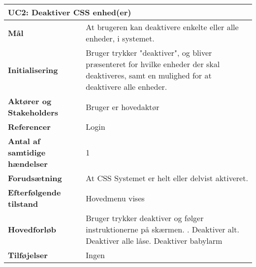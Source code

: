 \begin{table}[H] \centering
\begin{tabular}{|p{6cm}|p{8cm}|}
	\hline
\multicolumn{2}{|l|}{\textbf{UC2: Deaktiver CSS enhed(er)}} \\\hline
\textbf{Mål}	&
At brugeren kan deaktivere enkelte eller alle enheder, i systemet.
\\\hline
\textbf{Initialisering} &
Bruger trykker "deaktiver", og bliver
præsenteret for hvilke enheder der skal deaktiveres, samt en mulighed for at deaktivere alle
enheder. 
\\\hline
\textbf{Aktører og Stakeholders}	&
Bruger er hovedaktør
\\\hline
\textbf{Referencer} &
Login
\\\hline
\textbf{Antal af samtidige hændelser} &
1
\\\hline
\textbf{Forudsætning} &
At CSS Systemet er helt eller delvist aktiveret.
\\\hline
\textbf{Efterfølgende tilstand} &
Hovedmenu vises
\\\hline
\textbf{Hovedforløb}	&
Bruger trykker deaktiver og følger instruktionerne på skærmen. \newline
1. Deaktiver alt\newline
2. Deaktiver alle låse\newline
3. Deaktiver babylarm\newline
\\\hline
\textbf{Tilføjelser}	&
Ingen
\\\hline
	\end{tabular}
	\label{tab:UC2} 
\end{table}